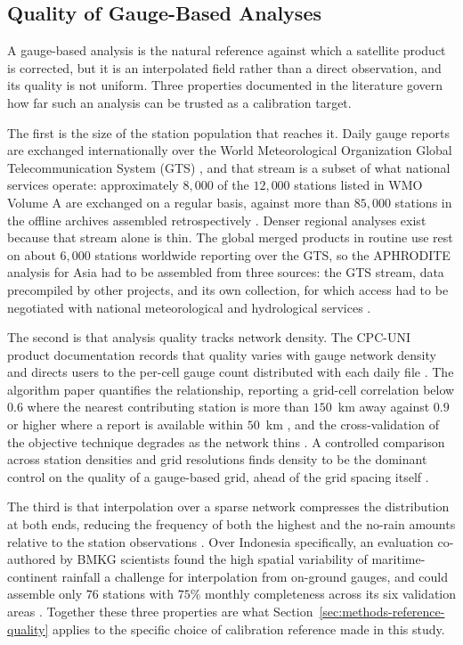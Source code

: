 \subsection{Quality of Gauge-Based Analyses}\label{sec:lit-gauge-quality}

A gauge-based analysis is the natural reference against which a
satellite product is corrected, but it is an interpolated field
rather than a direct observation, and its quality is not uniform.
Three properties documented in the literature govern how far such
an analysis can be trusted as a calibration target.

The first is the size of the station population that reaches it.
Daily gauge reports are exchanged internationally over the World
Meteorological Organization Global Telecommunication System (GTS)
\citep{ref:chen2006gtsqc, ref:chen2008}, and that stream is a
subset of what national services operate: approximately $8{,}000$
of the $12{,}000$ stations listed in WMO Volume A are exchanged
on a regular basis, against more than $85{,}000$ stations in the
offline archives assembled retrospectively \citep{ref:becker2013}.
Denser regional analyses exist because that stream alone is thin.
The global merged products in routine use rest on about $6{,}000$
stations worldwide reporting over the GTS, so the APHRODITE
analysis for Asia had to be assembled from three sources: the GTS
stream, data precompiled by other projects, and its own collection,
for which access had to be negotiated with national meteorological
and hydrological services \citep{ref:yatagai2012}.

The second is that analysis quality tracks network density. The
CPC-UNI product documentation records that quality varies with
gauge network density and directs users to the per-cell gauge
count distributed with each daily file \citep{ref:cpcuni_readme}.
The algorithm paper quantifies the relationship, reporting a
grid-cell correlation below $0.6$ where the nearest contributing
station is more than $150$~km away against $0.9$ or higher where a
report is available within $50$~km \citep{ref:xie2007}, and the
cross-validation of the objective technique degrades as the
network thins \citep{ref:chen2008}. A controlled comparison across
station densities and grid resolutions finds density to be the
dominant control on the quality of a gauge-based grid, ahead of
the grid spacing itself \citep{ref:merino2021}.

The third is that interpolation over a sparse network compresses
the distribution at both ends, reducing the frequency of both the
highest and the no-rain amounts relative to the station
observations \citep{ref:xie2007}. Over Indonesia specifically, an
evaluation co-authored by BMKG scientists found the high spatial
variability of maritime-continent rainfall a challenge for
interpolation from on-ground gauges, and could assemble only $76$
stations with $75\%$ monthly completeness across its six
validation areas \citep{ref:vernimmen2012}. Together these three
properties are what
Section~\ref{sec:methods-reference-quality} applies to the
specific choice of calibration reference made in this study.


